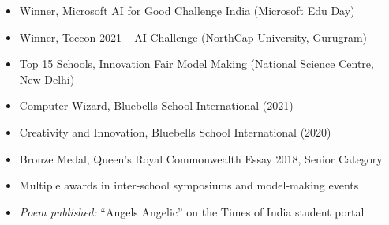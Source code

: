 \documentclass[a4paper,10pt]{article}
\begin{document}
\begin{itemize}[label=--]
    \item Winner, Microsoft AI for Good Challenge India (Microsoft Edu Day)
    \item Winner, Teccon 2021 -- AI Challenge (NorthCap University, Gurugram)
    \item Top 15 Schools, Innovation Fair Model Making (National Science Centre, New Delhi)
    \item Computer Wizard, Bluebells School International (2021)
    \item Creativity and Innovation, Bluebells School International (2020)
    \item Bronze Medal, Queen's Royal Commonwealth Essay 2018, Senior Category
    \item Multiple awards in inter-school symposiums and model-making events
    \item \textit{Poem published:} ``Angels Angelic'' on the Times of India student portal
\end{itemize}
\end{document}
